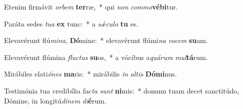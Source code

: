 \item Etenim firmávit \textit{or}\textit{bem} \textbf{ter}ræ,~* qui \textit{non} \textit{com}\textit{mo}\textbf{vé}\textbf{bi}tur.
\item Paráta sedes \textit{tu}\textit{a} \textbf{ex} tunc:~* a \textit{sǽ}\textit{cu}\textit{lo} \textbf{tu} es.
\item Elevavérunt flú\textit{mi}\textit{na}, \textbf{Dó}mine:~* elevavérunt flúmi\textit{na} \textit{vo}\textit{cem} \textbf{su}am.
\item Elevavérunt flúmina \textit{fluc}\textit{tus} \textbf{su}os,~* a vócibus a\textit{quá}\textit{rum} \textit{mul}\textbf{tá}rum.
\item Mirábiles elati\textit{ó}\textit{nes} \textbf{ma}ris:~* mirábilis \textit{in} \textit{al}\textit{tis} \textbf{Dó}\textbf{mi}nus.
\item Testimónia tua credibília fac\textit{ta} \textit{sunt} \textbf{ni}mis:~* domum tuam decet sanctitúdo, Dómine, in longitú\textit{di}\textit{nem} \textit{di}\textbf{é}rum.
